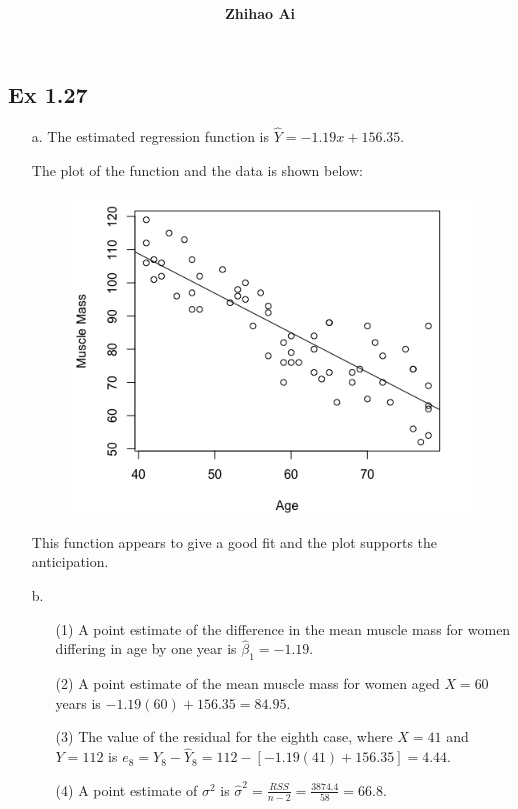 \documentclass[10pt]{report}
\title{
	\vspace{2in}
	\textmd{\textbf{\hwCourse\\\hwTitle}}\\
	\vspace{0.3in}\large{\textit{\hmwkClassInstructor}}
	\vspace{3in}
}
\author{\textbf{Zhihao Ai}}
\date{}
\begin{document}
\maketitle

\subsection*{Ex 1.27}
\begin{enumerate}
	\item [a.]
	The estimated regression function is $\hat{Y} = -1.19x + 156.35$.
	
	The plot of the function and the data is shown below:
	\begin{figure}[H]
		\centering
		\includegraphics[width=.7\linewidth]{27a.png}
	\end{figure}
	This function appears to give a good fit and the plot supports the anticipation.
	
	\item [b.]
	\begin{enumerate}
		\item [(1)]
		A point estimate of the difference in the mean muscle mass for women differing in age by one year is $\hat{\beta}_1 = -1.19$.
		
		\item [(2)]
		A point estimate of the mean muscle mass for women aged $X=60$ years is $-1.19(60) + 156.35 = 84.95$.
		
		\item [(3)]
		The value of the residual for the eighth case, where $X=41$ and $Y=112$ is $e_8 = Y_8 - \hat{Y}_8 = 112 - [-1.19(41) + 156.35] = 4.44$.
		
		\item [(4)]
		A point estimate of $\sigma^2$ is $\hat{\sigma}^2 = \frac{RSS}{n-2} = \frac{3874.4}{58} = 66.8$.
		
	\end{enumerate}
\end{enumerate}
\end{document}
